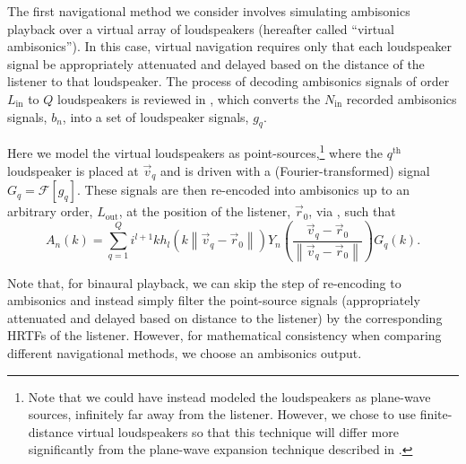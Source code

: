 The first navigational method we consider involves simulating ambisonics playback over a virtual array of loudspeakers (hereafter called ``virtual ambisonics'').
In this case, virtual navigation requires only that each loudspeaker signal be appropriately attenuated and delayed based on the distance of the listener to that loudspeaker.
The process of decoding ambisonics signals of order $L_\text{in}$ to $Q$ loudspeakers is reviewed in , which converts the $N_\text{in}$ recorded ambisonics signals, $b_n$, into a set of loudspeaker signals, $g_q$.

Here we model the virtual loudspeakers as point-sources,\footnote{Note that we could have instead modeled the loudspeakers as plane-wave sources, infinitely far away from the listener. However, we chose to use finite-distance virtual loudspeakers so that this technique will differ more significantly from the plane-wave expansion technique described in .} where the $q^\text{th}$ loudspeaker is placed at $\vec{v}_q$ and is driven with a (Fourier-transformed) signal $G_q = \mathcal{F} \left[ g_q \right]$.
These signals are then re-encoded into ambisonics up to an arbitrary order, $L_\text{out}$, at the position of the listener, $\vec{r}_0$, via , such that
\begin{equation}\label{eq:03_Navigation_Techniques:VA_Output}
A_n(k) = \sum_{q = 1}^Q i^{l+1} k h_l(k \left\| \vec{v}_q - \vec{r}_0 \right\|) Y_n \left( \frac{\vec{v}_q - \vec{r}_0}{\left\| \vec{v}_q - \vec{r}_0 \right\|} \right) G_q(k).
\end{equation}

Note that, for binaural playback, we can skip the step of re-encoding to ambisonics and instead simply filter the point-source signals (appropriately attenuated and delayed based on distance to the listener) by the corresponding HRTFs of the listener.
However, for mathematical consistency when comparing different navigational methods, we choose an ambisonics output.


